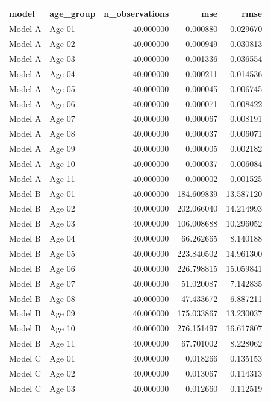 \begin{table}[ht]
\centering
\begin{tabular}{llrrr}
\hline
model & age_group & n_observations & mse & rmse \\
\hline
Model A & Age 01 & 40.000000 & 0.000880 & 0.029670 \\
Model A & Age 02 & 40.000000 & 0.000949 & 0.030813 \\
Model A & Age 03 & 40.000000 & 0.001336 & 0.036554 \\
Model A & Age 04 & 40.000000 & 0.000211 & 0.014536 \\
Model A & Age 05 & 40.000000 & 0.000045 & 0.006745 \\
Model A & Age 06 & 40.000000 & 0.000071 & 0.008422 \\
Model A & Age 07 & 40.000000 & 0.000067 & 0.008191 \\
Model A & Age 08 & 40.000000 & 0.000037 & 0.006071 \\
Model A & Age 09 & 40.000000 & 0.000005 & 0.002182 \\
Model A & Age 10 & 40.000000 & 0.000037 & 0.006084 \\
Model A & Age 11 & 40.000000 & 0.000002 & 0.001525 \\
Model B & Age 01 & 40.000000 & 184.609839 & 13.587120 \\
Model B & Age 02 & 40.000000 & 202.066040 & 14.214993 \\
Model B & Age 03 & 40.000000 & 106.008688 & 10.296052 \\
Model B & Age 04 & 40.000000 & 66.262665 & 8.140188 \\
Model B & Age 05 & 40.000000 & 223.840502 & 14.961300 \\
Model B & Age 06 & 40.000000 & 226.798815 & 15.059841 \\
Model B & Age 07 & 40.000000 & 51.020087 & 7.142835 \\
Model B & Age 08 & 40.000000 & 47.433672 & 6.887211 \\
Model B & Age 09 & 40.000000 & 175.033867 & 13.230037 \\
Model B & Age 10 & 40.000000 & 276.151497 & 16.617807 \\
Model B & Age 11 & 40.000000 & 67.701002 & 8.228062 \\
Model C & Age 01 & 40.000000 & 0.018266 & 0.135153 \\
Model C & Age 02 & 40.000000 & 0.013067 & 0.114313 \\
Model C & Age 03 & 40.000000 & 0.012660 & 0.112519 \\

\end{tabular}
\end{table}
